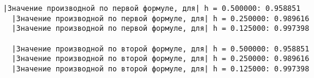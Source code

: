 \begin{lstlisting}[backgroundcolor=\color{cyan}]
  |Значение производной по первой формуле, для| h = 0.500000: 0.958851
  |Значение производной по первой формуле, для| h = 0.250000: 0.989616
  |Значение производной по первой формуле, для| h = 0.125000: 0.997398

  |Значение производной по второй формуле, для| h = 0.500000: 0.958851
  |Значение производной по второй формуле, для| h = 0.250000: 0.989616
  |Значение производной по второй формуле, для| h = 0.125000: 0.997398
\end{lstlisting}
